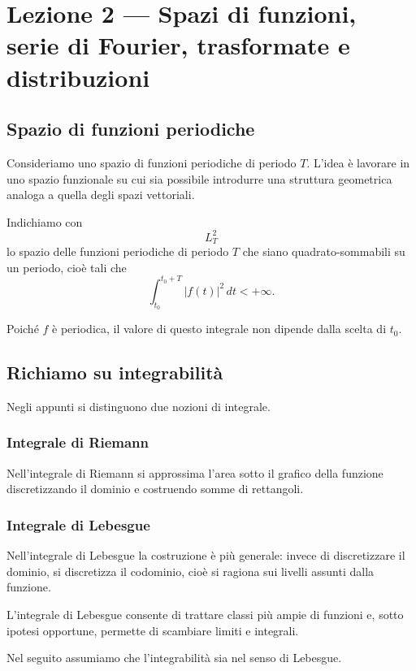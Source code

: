 \chapter{Lezione 2 --- Spazi di funzioni, serie di Fourier, trasformate e distribuzioni}

\section{Spazio di funzioni periodiche}

Consideriamo uno spazio di funzioni periodiche di periodo \(T\).
L'idea è lavorare in uno spazio funzionale su cui sia possibile introdurre
una struttura geometrica analoga a quella degli spazi vettoriali.

Indichiamo con
\[
L_T^2
\]
lo spazio delle funzioni periodiche di periodo \(T\) che siano quadrato-sommabili
su un periodo, cioè tali che
\[
\int_{t_0}^{t_0+T} |f(t)|^2\,dt < +\infty.
\]

Poiché \(f\) è periodica, il valore di questo integrale non dipende dalla scelta di \(t_0\).

\section{Richiamo su integrabilità}

Negli appunti si distinguono due nozioni di integrale.

\subsection{Integrale di Riemann}

Nell'integrale di Riemann si approssima l'area sotto il grafico della funzione
discretizzando il dominio e costruendo somme di rettangoli.

\subsection{Integrale di Lebesgue}

Nell'integrale di Lebesgue la costruzione è più generale:
invece di discretizzare il dominio, si discretizza il codominio,
cioè si ragiona sui livelli assunti dalla funzione.

L'integrale di Lebesgue consente di trattare classi più ampie di funzioni
e, sotto ipotesi opportune, permette di scambiare limiti e integrali.

Nel seguito assumiamo che l'integrabilità sia nel senso di Lebesgue.


